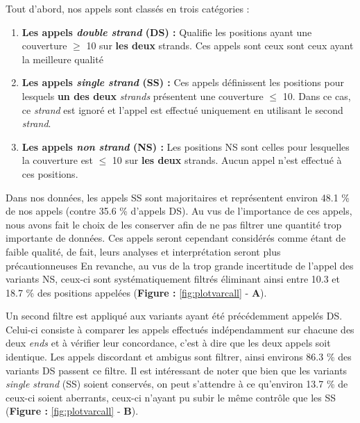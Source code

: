 \documentclass[12pt,twoside]{reedthesis}
\providecommand{\tightlist}{%
  \setlength{\itemsep}{0pt}\setlength{\parskip}{0pt}}
\theoremstyle{definition}
\theoremstyle{definition}
\theoremstyle{remark}
\begin{document}
  Tout d'abord, nos appels sont classés en trois catégories :
  
  \begin{enumerate}
  \def\labelenumi{\arabic{enumi}.}
  \tightlist
  \item
    \textbf{Les appels \emph{double strand} (DS) :} Qualifie les positions
    ayant une couverture \(\ge\) 10 sur \textbf{les deux} strands. Ces
    appels sont ceux sont ceux ayant la meilleure qualité
  \item
    \textbf{Les appels \emph{single strand} (SS) :} Ces appels définissent
    les positions pour lesquels \textbf{un des deux} \emph{strands}
    présentent une couverture \(\le\) 10. Dans ce cas, ce \emph{strand}
    est ignoré et l'appel est effectué uniquement en utilisant le second
    \emph{strand}.\\
  \item
    \textbf{Les appels \emph{non strand} (NS) :} Les positions NS sont
    celles pour lesquelles la couverture est \(\le\) 10 sur \textbf{les
    deux} strands. Aucun appel n'est effectué à ces positions.
  \end{enumerate}
  
  Dans nos données, les appels SS sont majoritaires et représentent
  environ 48.1 \% de nos appels (contre 35.6 \% d'appels DS). Au vus de
  l'importance de ces appels, nous avons fait le choix de les conserver
  afin de ne pas filtrer une quantité trop importante de données. Ces
  appels seront cependant considérés comme étant de faible qualité, de
  fait, leurs analyses et interprétation seront plus précautionneuses En
  revanche, au vus de la trop grande incertitude de l'appel des variants
  NS, ceux-ci sont systématiquement filtrés éliminant ainsi entre 10.3 et
  18.7 \% des positions appelées (\textbf{Figure : }\ref{fig:plotvarcall}
  - \textbf{A}).
  
  Un second filtre est appliqué aux variants ayant été précédemment
  appelés DS. Celui-ci consiste à comparer les appels effectués
  indépendamment sur chacune des deux \emph{ends} et à vérifier leur
  concordance, c'est à dire que les deux appels soit identique. Les appels
  discordant et ambigus sont filtrer, ainsi environs 86.3 \% des variants
  DS passent ce filtre. Il est intéressant de noter que bien que les
  variants \emph{single strand} (SS) soient conservés, on peut s'attendre
  à ce qu'environ 13.7 \% de ceux-ci soient aberrants, ceux-ci n'ayant pu
  subir le même contrôle que les SS (\textbf{Figure :
  }\ref{fig:plotvarcall} - \textbf{B}).
  
\end{document}
